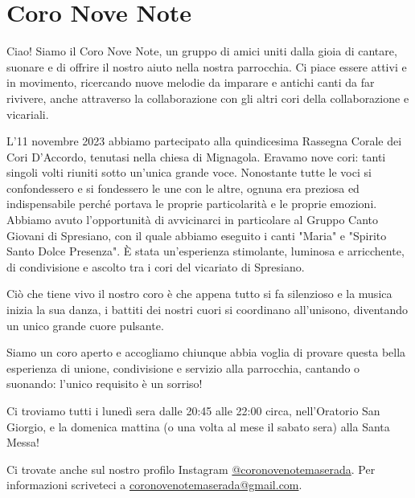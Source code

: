 \section{Coro Nove Note}
Ciao! Siamo il Coro Nove Note, un gruppo di amici uniti dalla gioia di cantare, suonare e di offrire il nostro aiuto nella nostra parrocchia.
Ci piace essere attivi e in movimento, ricercando nuove melodie da imparare e antichi canti da far rivivere, anche attraverso la collaborazione con gli altri cori della collaborazione e vicariali.


L'11 novembre 2023 abbiamo partecipato alla quindicesima Rassegna Corale dei Cori D'Accordo, tenutasi nella chiesa di Mignagola. 
Eravamo nove cori: tanti singoli volti riuniti sotto un'unica grande voce. Nonostante tutte le voci si confondessero e si fondessero le une con le altre, ognuna era preziosa ed indispensabile perché portava le proprie particolarità e le proprie emozioni.
Abbiamo avuto l'opportunità di avvicinarci in particolare al Gruppo Canto Giovani di Spresiano, con il quale abbiamo eseguito i canti "Maria" e "Spirito Santo Dolce Presenza".
È stata un'esperienza stimolante, luminosa e arricchente, di condivisione e ascolto tra i cori del vicariato di Spresiano. 


Ciò che tiene vivo il nostro coro è che appena tutto si fa silenzioso e la musica inizia la sua danza, i battiti dei nostri cuori si coordinano all'unisono, diventando un unico grande cuore pulsante.


Siamo un coro aperto e accogliamo chiunque abbia voglia di provare questa bella esperienza di unione, condivisione e servizio alla parrocchia, cantando o suonando: l'unico requisito è un sorriso!


Ci troviamo tutti i lunedì sera dalle 20:45 alle 22:00 circa, nell'Oratorio San Giorgio, e la domenica mattina (o una volta al mese il sabato sera) alla Santa Messa!


Ci trovate anche sul nostro profilo Instagram \url{@coronovenotemaserada}. Per informazioni scriveteci a \url{coronovenotemaserada@gmail.com}.


